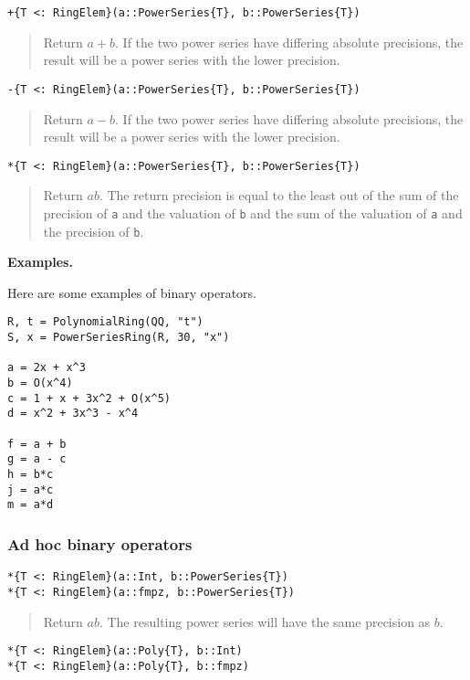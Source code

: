 \documentclass[a4paper,10pt]{article}
\newcommand{\code}{\lstinline}
\newcommand{\desc}[1]{\vspace{-3mm}\begin{quote}#1\end{quote}}
\begin{document}
\begin{lstlisting}
+{T <: RingElem}(a::PowerSeries{T}, b::PowerSeries{T})
\end{lstlisting}

\desc{Return $a + b$. If the two power series have differing absolute
precisions, the result will be a power series with the lower precision.}

\begin{lstlisting}
-{T <: RingElem}(a::PowerSeries{T}, b::PowerSeries{T})
\end{lstlisting}

\desc{Return $a - b$. If the two power series have differing absolute
precisions, the result will be a power series with the lower precision.}

\begin{lstlisting}
*{T <: RingElem}(a::PowerSeries{T}, b::PowerSeries{T})
\end{lstlisting}

\desc{Return $ab$. The return precision is equal to the least out of the
sum of the precision of \code{a} and the valuation of \code{b} and
the sum of the valuation of \code{a} and the precision of \code{b}.}

\textbf{Examples.}

Here are some examples of binary operators.

\begin{lstlisting}
R, t = PolynomialRing(QQ, "t")
S, x = PowerSeriesRing(R, 30, "x")

a = 2x + x^3
b = O(x^4)
c = 1 + x + 3x^2 + O(x^5)
d = x^2 + 3x^3 - x^4

f = a + b
g = a - c
h = b*c
j = a*c
m = a*d
\end{lstlisting}

\subsubsection{Ad hoc binary operators}

\begin{lstlisting}
*{T <: RingElem}(a::Int, b::PowerSeries{T})
*{T <: RingElem}(a::fmpz, b::PowerSeries{T})
\end{lstlisting}

\desc{Return $ab$. The resulting power series will have the same precision as
$b$.}

\begin{lstlisting}
*{T <: RingElem}(a::Poly{T}, b::Int)
*{T <: RingElem}(a::Poly{T}, b::fmpz)
\end{lstlisting}
\end{document}
